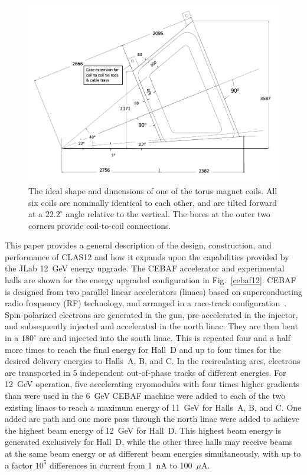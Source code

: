 \documentclass[final,3p,twocolumn]{elsarticle}
\begin{document}
\begin{figure}[htbp!]
\centerline{\includegraphics[width=1.70\columnwidth]{clas12_desired.png}}
\caption{The ideal shape and dimensions of one of the torus magnet coils. All six coils are nominally identical to each
other, and are tilted forward at a $22.2^\circ$ angle relative to the vertical. The bores at the outer two corners
provide coil-to-coil connections.}
\label{coil-shape}
\end{figure}

This paper provides a general description of the design, construction, and performance of CLAS12 and how it expands
upon the capabilities provided by the JLab 12~GeV energy upgrade. The CEBAF accelerator and experimental halls
are shown for the energy upgraded configuration in Fig.~\ref{cebaf12}. CEBAF is designed from two parallel linear
accelerators (linacs) based on superconducting radio frequency (RF) technology, and arranged in a race-track
configuration~\cite{Leemann:2001dg}. Spin-polarized electrons are generated in the gun, pre-accelerated in the
injector, and subsequently injected and accelerated in the north linac. They are then bent in a $180^\circ$ arc and
injected into the south linac. This is repeated four and a half more times to reach the final energy for Hall~D and up to
four times  for the desired delivery energies to Halls~A, B, and C. In the recirculating arcs, electrons are transported
in 5 independent out-of-phase tracks of different energies. For 12~GeV operation, five accelerating cryomodules with
four times higher gradients than were used in the 6~GeV CEBAF machine were added to each of the two existing linacs
to reach a maximum energy of 11~GeV for Halls~A, B, and C. One added arc path and one more pass through the north
linac were added to achieve the highest beam energy of 12~GeV for Hall~D. This highest beam energy is generated
exclusively for Hall~D, while the other three halls may receive beams at the same beam energy or at different beam
energies simultaneously, with up to a factor $10^5$ differences in current from 1~nA to 100~$\mu$A.
\end{document}
